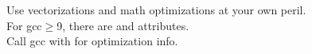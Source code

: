Use vectorizations and math optimizations at your own peril.\\
For gcc$\ge$9, there are \icode{[[likely]]} and \icode{[[unlikely]]} attributes.\\
Call gcc with  for optimization info.
